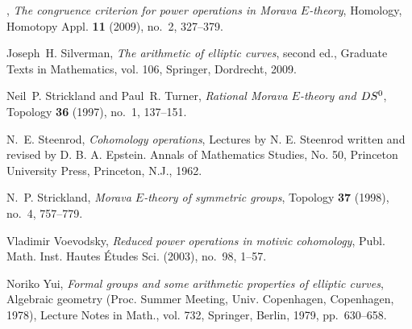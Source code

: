 \documentclass{gtpart}
\theoremstyle{definition}
\theoremstyle{remark}
\begin{document}
\begin{thebibliography}
\bysame, \emph{The congruence criterion for power operations in {M}orava
  {$E$}-theory}, Homology, Homotopy Appl. \textbf{11} (2009), no.~2, 327--379.

Joseph~H. Silverman, \emph{The arithmetic of elliptic curves}, second ed.,
  Graduate Texts in Mathematics, vol. 106, Springer, Dordrecht, 2009.

Neil~P. Strickland and Paul~R. Turner, \emph{Rational {M}orava {$E$}-theory and
  {$DS\sp 0$}}, Topology \textbf{36} (1997), no.~1, 137--151. 

N.~E. Steenrod, \emph{Cohomology operations}, Lectures by N. E. Steenrod
  written and revised by D. B. A. Epstein. Annals of Mathematics Studies, No.
  50, Princeton University Press, Princeton, N.J., 1962. 

N.~P. Strickland, \emph{Morava {$E$}-theory of symmetric groups}, Topology
  \textbf{37} (1998), no.~4, 757--779. 

Vladimir Voevodsky, \emph{Reduced power operations in motivic cohomology},
  Publ. Math. Inst. Hautes \'Etudes Sci. (2003), no.~98, 1--57. 

Noriko Yui, \emph{Formal groups and some arithmetic properties of elliptic
  curves}, Algebraic geometry ({P}roc. {S}ummer {M}eeting, {U}niv.
  {C}openhagen, {C}openhagen, 1978), Lecture Notes in Math., vol. 732,
  Springer, Berlin, 1979, pp.~630--658. 

\end{thebibliography}
\end{document}

